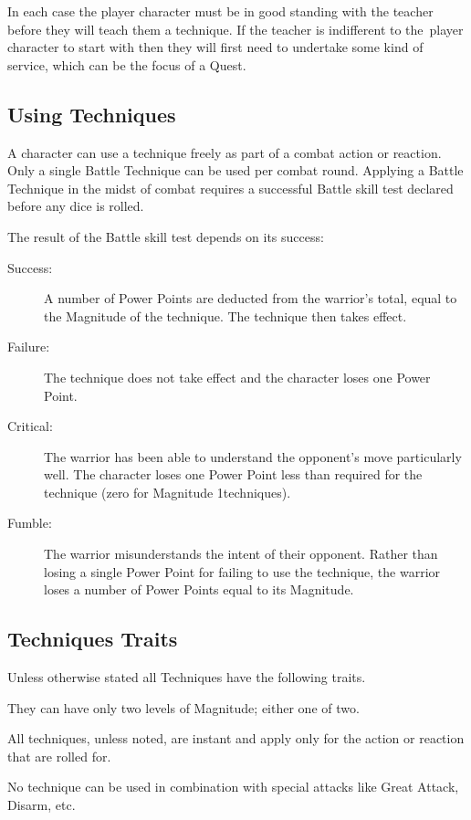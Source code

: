 In each case the player character must be in good standing with the teacher before they will teach them a technique. If the teacher is indifferent to the player character to start with then they will first need to undertake some kind of service, which can be the focus of a Quest.

\subsection{Using Techniques}
A character can use a technique freely as part of a combat action or reaction. Only a single Battle Technique can be used per combat round. Applying a Battle Technique in the midst of combat requires a successful Battle skill test declared before any dice is rolled.

The result of the Battle skill test depends on its success:
\begin{description}
	\item[Success:] A number of Power Points are deducted from the warrior’s total, equal to the Magnitude of the technique. The technique then takes effect.
	\item[Failure:] The technique does not take effect and the character loses one Power Point.
	\item[Critical:] The warrior has been able to understand the opponent's move particularly well. The character loses one Power Point less than required for the technique (zero for Magnitude 1techniques).
	\item[Fumble:] The warrior misunderstands the intent of their opponent. Rather than losing a single Power Point for failing to use the technique, the warrior loses a number of Power Points equal to its Magnitude. 
\end{description}


\subsection{Techniques Traits}
Unless otherwise stated all Techniques have the following traits.

\begin{rpg-list}
\item They can have only two levels of Magnitude; either one of two.
\item All techniques, unless noted, are instant and apply only for the action or reaction that are rolled for.
\item No technique can be used in combination with special attacks like Great Attack, Disarm, etc.
\end{rpg-list}

